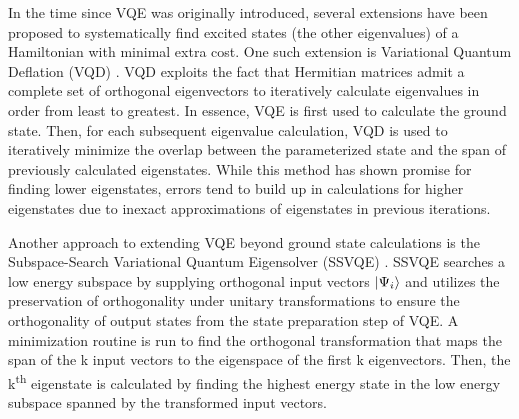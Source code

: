 In the time since VQE was originally introduced, several extensions have been proposed to systematically find excited states (the other eigenvalues) of a Hamiltonian with minimal extra cost.  One such extension is Variational Quantum Deflation (VQD) \cite{higgott_variational_2019}.  VQD exploits the fact that Hermitian matrices admit a complete set of orthogonal eigenvectors to iteratively calculate eigenvalues in order from least to greatest.  In essence, VQE is first used to calculate the ground state.  Then, for each subsequent eigenvalue calculation, VQD is used to iteratively minimize the overlap between the parameterized state and the span of previously calculated eigenstates.  While this method has shown promise for finding lower eigenstates, errors tend to build up in calculations for higher eigenstates due to inexact approximations of eigenstates in previous iterations.

Another approach to extending VQE beyond ground state calculations is the Subspace-Search Variational Quantum Eigensolver (SSVQE) \cite{nakanishi_subspace-search_2019}.  SSVQE searches a low energy subspace by supplying orthogonal input vectors $\ket{\Psi_i}$ and utilizes the preservation of orthogonality under unitary transformations to ensure the orthogonality of output states from the state preparation step of VQE.  A minimization routine is run to find the orthogonal transformation that maps the span of the k input vectors to the eigenspace of the first k eigenvectors.  Then, the k\textsuperscript{th} eigenstate is calculated by finding the highest energy state in the low energy subspace spanned by the transformed input vectors.